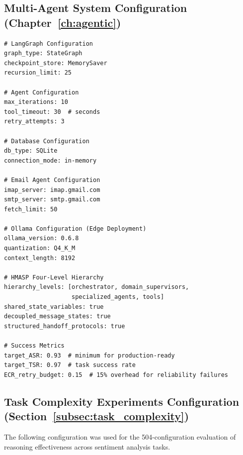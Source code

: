 \subsection{Multi-Agent System Configuration (Chapter~\ref{ch:agentic})}

\begin{verbatim}
# LangGraph Configuration
graph_type: StateGraph
checkpoint_store: MemorySaver
recursion_limit: 25

# Agent Configuration
max_iterations: 10
tool_timeout: 30  # seconds
retry_attempts: 3

# Database Configuration
db_type: SQLite
connection_mode: in-memory

# Email Agent Configuration
imap_server: imap.gmail.com
smtp_server: smtp.gmail.com
fetch_limit: 50

# Ollama Configuration (Edge Deployment)
ollama_version: 0.6.8
quantization: Q4_K_M
context_length: 8192

# HMASP Four-Level Hierarchy
hierarchy_levels: [orchestrator, domain_supervisors, 
                   specialized_agents, tools]
shared_state_variables: true
decoupled_message_states: true
structured_handoff_protocols: true

# Success Metrics
target_ASR: 0.93  # minimum for production-ready
target_TSR: 0.97  # task success rate
ECR_retry_budget: 0.15  # 15% overhead for reliability failures
\end{verbatim}

\subsection{Task Complexity Experiments Configuration (Section~\ref{subsec:task_complexity})}

The following configuration was used for the 504-configuration evaluation of reasoning effectiveness across sentiment analysis tasks.

